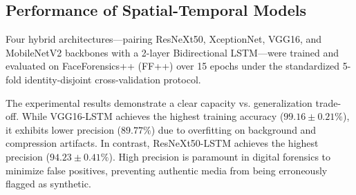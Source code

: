 \subsection{Performance of Spatial-Temporal Models}
Four hybrid architectures—pairing ResNeXt50, XceptionNet, VGG16, and MobileNetV2 backbones with a 2-layer Bidirectional LSTM—were trained and evaluated on FaceForensics++ (FF++) \citep{roessler2019faceforensicspp} over 15 epochs under the standardized 5-fold identity-disjoint cross-validation protocol.

\begin{table}[ht]
    \centering
    \caption{Performance Metrics for 5-Fold Cross Validation on FF++ ($\text{Mean} \pm \text{Std Dev}$, 15 Epochs).}
    \label{tab:cnn_lstm_results}
    \par{}
\end{table}

The experimental results demonstrate a clear capacity vs. generalization trade-off. While VGG16-LSTM achieves the highest training accuracy ($99.16 \pm 0.21\%$), it exhibits lower precision ($89.77\%$) due to overfitting on background and compression artifacts. In contrast, ResNeXt50-LSTM achieves the highest precision ($94.23 \pm 0.41\%$). High precision is paramount in digital forensics to minimize false positives, preventing authentic media from being erroneously flagged as synthetic.

